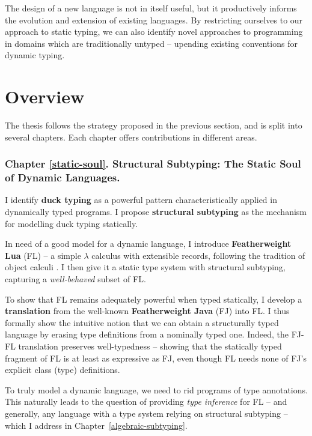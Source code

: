 The design of a new language is not in itself useful, but it productively informs the evolution and extension of existing languages.
By restricting ourselves to our approach to static typing, we can also identify novel approaches to programming in domains which are traditionally untyped -- upending existing conventions for dynamic typing. 

\section{Overview}

The thesis follows the strategy proposed in the previous section, and is split into several chapters. Each chapter offers contributions in different areas.

\subsubsection{Chapter \ref{static-soul}. Structural Subtyping: The Static Soul of Dynamic Languages.} 

I identify \textbf{duck typing} as a powerful pattern characteristically applied in dynamically typed programs. I propose \textbf{structural subtyping} as the mechanism for modelling duck typing statically.

In need of a good model for a dynamic language, I introduce \textbf{Featherweight Lua} (FL) -- a simple $\lambda$ calculus with extensible records, following the tradition of object calculi \cite{abadi-cardelli-object-calculus}. I then give it a static type system with structural subtyping, capturing a \emph{well-behaved} subset of FL.

To show that FL remains adequately powerful when typed statically, I develop a \textbf{translation} from the well-known \textbf{Featherweight Java} (FJ) \cite{featherweight-java} into FL. 
I thus formally show the intuitive notion that we can obtain a structurally typed language by erasing type definitions from a nominally typed one.
Indeed, the FJ-FL translation preserves well-typedness -- showing that the statically typed fragment of FL is at least as expressive as FJ, even though FL needs none of FJ's explicit class (type) definitions. 

To truly model a dynamic language, we need to rid programs of type annotations. This naturally leads to the question of providing \emph{type inference} for FL -- and generally, any language with a type system relying on structural subtyping -- which I address in Chapter~\ref{algebraic-subtyping}.

